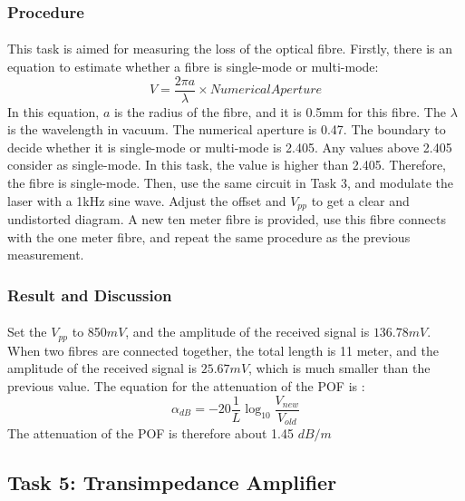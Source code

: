 \documentclass[12pt]{article}
\begin{document}
    \subsubsection{Procedure}
    \paragraph{}
    This task is aimed for measuring the loss of the optical fibre. Firstly, there is an equation to estimate whether a fibre is single-mode or multi-mode:
    \begin{equation}
        V = \frac{2 \pi a}{\lambda} \times Numerical Aperture
    \end{equation}
    In this equation, $a$ is the radius of the fibre, and it is 0.5mm for this fibre. The $\lambda$ is the wavelength in vacuum. The numerical aperture is 0.47. The boundary to decide whether it is single-mode or multi-mode is 2.405. Any values above 2.405 consider as single-mode. In this task, the value is higher than 2.405. Therefore, the fibre is single-mode. Then, use the same circuit in Task 3, and modulate the laser with a 1kHz sine wave. Adjust the offset and $V_{pp}$ to get a clear and undistorted diagram. A new ten meter fibre is provided, use this fibre connects with the one meter fibre, and repeat the same procedure as the previous measurement.
    
    
    \subsubsection{Result and Discussion}
    \paragraph{}
     Set the $V_{pp}$ to 850$mV$, and the amplitude of the received signal is $136.78mV$. When two fibres are connected together, the total length is 11 meter, and the amplitude of the received signal is $25.67mV$, which is much smaller than the previous value. The equation for the attenuation of the POF is :
    \begin{equation}
    \alpha_{dB} = -20 \frac{1}{L} \log_{10}\frac{V_{new}}{V_{old}}
    \end{equation}
    The attenuation of the POF is therefore about 1.45 $dB/m$


    \subsection{Task 5: Transimpedance Amplifier}
\end{document}
